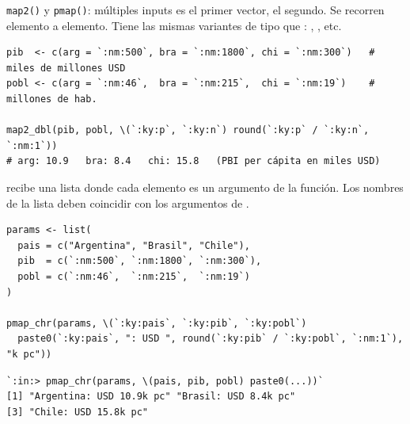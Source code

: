 \documentclass[8pt]{beamer}
\begin{document}
	\begin{frame}[fragile]{\texttt{map2()} y \texttt{pmap()}: múltiples inputs}
		 es el primer vector,  el segundo. Se recorren elemento a elemento. Tiene las mismas variantes de tipo que : , , etc.

\begin{lstlisting}[style=RScript]
pib  <- c(arg = `:nm:500`, bra = `:nm:1800`, chi = `:nm:300`)   # miles de millones USD
pobl <- c(arg = `:nm:46`,  bra = `:nm:215`,  chi = `:nm:19`)    # millones de hab.

map2_dbl(pib, pobl, \(`:ky:p`, `:ky:n`) round(`:ky:p` / `:ky:n`, `:nm:1`))
# arg: 10.9   bra: 8.4   chi: 15.8   (PBI per cápita en miles USD)
\end{lstlisting}

		 recibe una lista donde cada elemento es un argumento de la función. Los nombres de la lista deben coincidir con los argumentos de .

\begin{lstlisting}[style=RScript]
params <- list(
  pais = c("Argentina", "Brasil", "Chile"),
  pib  = c(`:nm:500`, `:nm:1800`, `:nm:300`),
  pobl = c(`:nm:46`,  `:nm:215`,  `:nm:19`)
)

pmap_chr(params, \(`:ky:pais`, `:ky:pib`, `:ky:pobl`)
  paste0(`:ky:pais`, ": USD ", round(`:ky:pib` / `:ky:pobl`, `:nm:1`), "k pc"))
\end{lstlisting}
\begin{lstlisting}[style=RConsole]
`:in:> pmap_chr(params, \(pais, pib, pobl) paste0(...))`
[1] "Argentina: USD 10.9k pc" "Brasil: USD 8.4k pc"
[3] "Chile: USD 15.8k pc"
\end{lstlisting}
	\end{frame}
\end{document}
